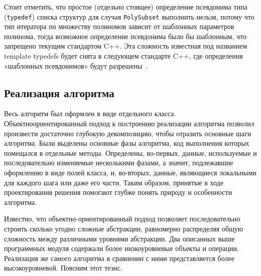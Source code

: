 \documentclass[14pt]{extarticle}
\begin{document}
Стоит отметить, что простое (отдельно стоящее) определение псевдонима типа
(\texttt{typedef}) списка структур для случая \texttt{PolySubset} выполнить
нельзя, потому что тип итератора по множеству полиномов зависит от шаблонных
параметров полинома, тогда возможное определение псевдонима было бы шаблонным,
что запрещено текущим стандартом C++. Эта сложность известная под названием
template typedefs будет снята в следующем стандарте C++, где определения
«шаблонных псевдонимов» будут разрешены~\cite{Cpp0x}.

\subsection{Реализация алгоритма}
Весь алгоритм был оформлен в виде отдельного класса. Объектно\nbdash ориентированный
подход к построению реализации алгоритма позволил произвести достаточно глубокую
декомпозицию, чтобы отразить основные шаги алгоритма. Были выделены основные
фазы алгоритма, код выполнения которых помещался в отдельные методы. Определены,
во-первых, данные, используемые и последовательно изменяемые несколькими фазами,
а значит, подлежавшие оформлению в виде полей класса, и, во-вторых, данные,
являющиеся локальными для каждого шага или даже его части. Таким образом,
принятые в ходе проектирования решения помогают глубже понять природу и
особенности алгоритма. 

Известно, что объектно-ориентированный подход позволяет последовательно строить
сколько угодно сложные абстракции, равномерно распределяя общую сложность между
различными уровнями абстракции. Два описанных выше программных модуля содержали
более низкоуровневые объекты и операции. Реализация же самого алгоритма в
сравнении с ними представляется более высокоуровневой. Поясним этот тезис. 
\end{document}
